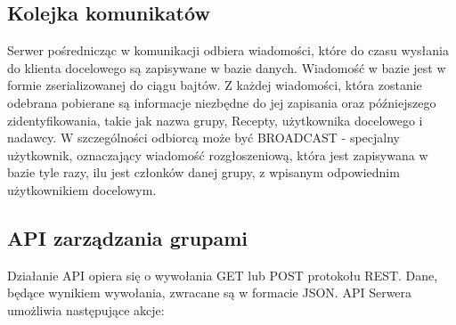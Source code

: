 \documentclass[11pt,a4paper,polish,thesis]{dcsbook}
\begin{document}
\subsection{Kolejka komunikatów}
Serwer pośrednicząc w komunikacji odbiera wiadomości, które do czasu wysłania do klienta docelowego są zapisywane w bazie danych.
Wiadomość w bazie jest w formie zserializowanej do ciągu bajtów.
Z każdej wiadomości, która zostanie odebrana pobierane są informacje niezbędne do jej zapisania oraz późniejszego zidentyfikowania, takie jak nazwa grupy, Recepty, użytkownika docelowego i nadawcy. W szczególności odbiorcą może być BROADCAST - specjalny użytkownik, oznaczający wiadomość rozgłoszeniową, która jest zapisywana w bazie tyle razy, ilu jest członków danej grupy, z wpisanym odpowiednim użytkownikiem docelowym. 

\subsection{API zarządzania grupami}
Działanie API opiera się o wywołania GET lub POST protokołu REST. Dane, będące wynikiem wywołania, zwracane są w formacie JSON.
API Serwera umożliwia następujące akcje:
\end{document}
